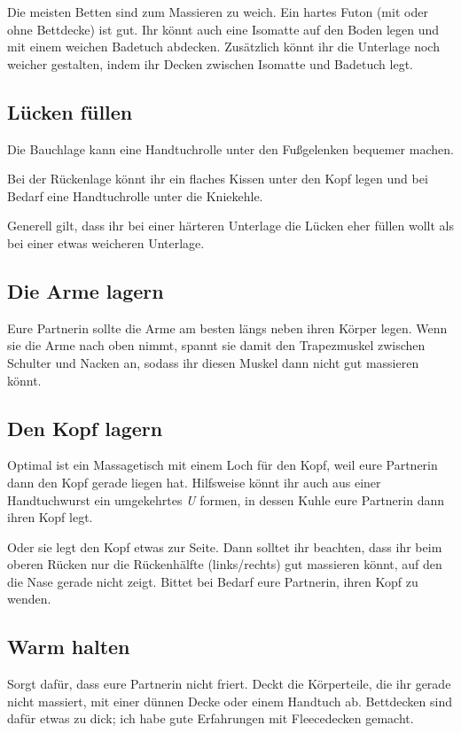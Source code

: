 Die meisten Betten sind zum Massieren zu weich. Ein hartes Futon (mit oder ohne Bettdecke) ist gut. Ihr könnt auch eine Isomatte auf den Boden legen und mit einem weichen Badetuch abdecken. Zusätzlich könnt ihr die Unterlage noch weicher gestalten, indem ihr Decken zwischen Isomatte und Badetuch legt.


\subsection{Lücken füllen}

Die Bauchlage kann eine Handtuchrolle unter den Fußgelenken bequemer machen.

Bei der Rückenlage könnt ihr ein flaches Kissen unter den Kopf legen und bei Bedarf eine Handtuchrolle unter die Kniekehle.

Generell gilt, dass ihr bei einer härteren Unterlage die Lücken eher füllen wollt als bei einer etwas weicheren Unterlage.


\subsection{Die Arme lagern}

Eure Partnerin sollte die Arme am besten längs neben ihren Körper legen. Wenn sie die Arme nach oben nimmt, spannt sie damit den Trapezmuskel zwischen Schulter und Nacken an, sodass ihr diesen Muskel dann nicht gut massieren könnt.


\subsection{Den Kopf lagern}

Optimal ist ein Massagetisch mit einem Loch für den Kopf, weil eure Partnerin dann den Kopf gerade liegen hat. Hilfsweise könnt ihr auch aus einer Handtuchwurst ein umgekehrtes \emph{U} formen, in dessen Kuhle eure Partnerin dann ihren Kopf legt.

Oder sie legt den Kopf etwas zur Seite. Dann solltet ihr beachten, dass ihr beim oberen Rücken nur die Rückenhälfte (links/rechts) gut massieren könnt, auf den die Nase gerade nicht zeigt. Bittet bei Bedarf eure Partnerin, ihren Kopf zu wenden.


\subsection{Warm halten}

Sorgt dafür, dass eure Partnerin nicht friert. Deckt die Körperteile, die ihr gerade nicht massiert, mit einer dünnen Decke oder einem Handtuch ab. Bettdecken sind dafür etwas zu dick; ich habe gute Erfahrungen mit Fleecedecken gemacht.



